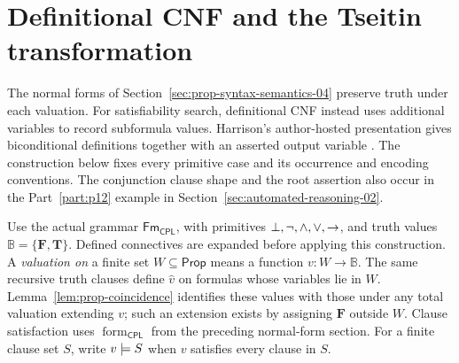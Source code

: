 \section{Definitional CNF and the Tseitin transformation}
\label{sec:p02-tseitin-transformation}

The normal forms of Section~\ref{sec:prop-syntax-semantics-04} preserve truth
under each valuation.  For satisfiability search, definitional CNF instead
uses additional variables to record subformula values.  Harrison's
author-hosted presentation gives biconditional definitions together with an
asserted output variable \cite[slide~12]{Harrison2003PropositionalSlides}.
The construction below fixes every primitive case and its occurrence and
encoding conventions.  The conjunction clause shape and the root assertion
also occur in the Part~\ref{part:p12} example in
Section~\ref{sec:automated-reasoning-02}.

Use the actual grammar \(\mathsf{Fm}_{\mathsf{CPL}}\), with primitives
\(\bot,\neg,\land,\lor,\to\), and truth values
\(\mathbb{B}=\{\mathbf{F},\mathbf{T}\}\).  Defined connectives are expanded before applying
this construction.  A \emph{valuation on} a finite set \(W\subseteq\mathsf{Prop}\)
means a function \(v:W\to\mathbb{B}\).  The same recursive truth clauses define
\(\widehat v\) on formulas whose variables lie in \(W\).
Lemma~\ref{lem:prop-coincidence} identifies these values with those under any
total valuation extending \(v\); such an extension exists by assigning
\(\mathbf{F}\) outside \(W\).  Clause satisfaction uses
\(\operatorname{form}_{\mathsf{CPL}}\) from the preceding normal-form section.
For a finite clause set \(S\), write \(v\models S\) when \(v\) satisfies
every clause in \(S\).

